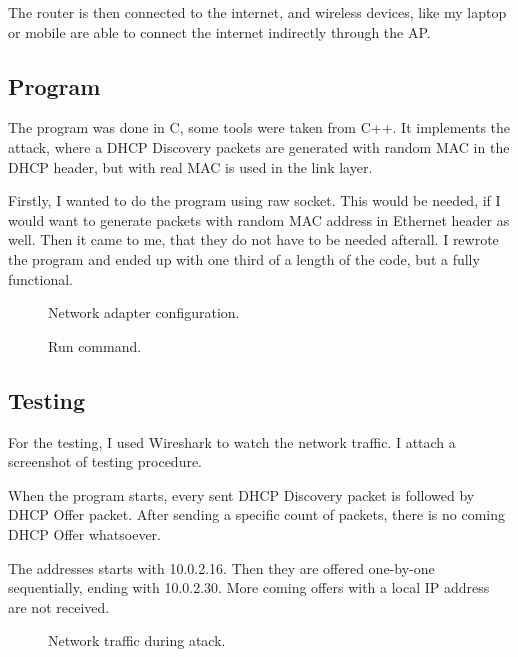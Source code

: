 \documentclass[10pt,a4paper,titlepage]{article}
\begin{document}
    The router is then connected to the internet, and wireless devices, like my laptop
    or mobile are able to connect the internet indirectly through the AP.
    
    \subsection*{Program}
    
    The program was done in C, some tools were taken from C++. It implements the attack,
    where a DHCP Discovery packets are generated with random MAC in the DHCP header,
    but with real MAC is used in the link layer.
    
    Firstly, I wanted to do the program using raw socket. This would be needed, if 
    I would want to generate packets with random MAC address in Ethernet header as well.
    Then it came to me, that they do not have to be needed afterall. I rewrote the
    program and ended up with one third of a length of the code, but a fully functional.
    
    \begin{figure}[h!]
        \begin{center}
            \caption{ Network adapter configuration. \label{fig:ifconfig}}
        \end{center}
    \end{figure}
    
    \begin{figure}[h!]
        \begin{center}
            \caption{ Run command. \label{fig:run}}
        \end{center}
    \end{figure}
    
    
    \subsection*{Testing}
    For the testing, I used Wireshark to watch the network traffic. I attach a
    screenshot of testing procedure.
    
    When the program starts, every sent DHCP Discovery packet is followed by DHCP Offer
    packet. After sending a specific count of packets, there is no coming DHCP
    Offer whatsoever.
    
    The addresses starts with 10.0.2.16. Then they are offered one-by-one sequentially,
    ending with 10.0.2.30. More coming offers with a local IP address are not
    received.
    
    \begin{figure}[h!]
        \begin{center}
            \caption{ Network traffic during atack. \label{fig:wireshark}}
        \end{center}
    \end{figure}
    
    \newpage
    \printbibliography
    
    
\end{document}
